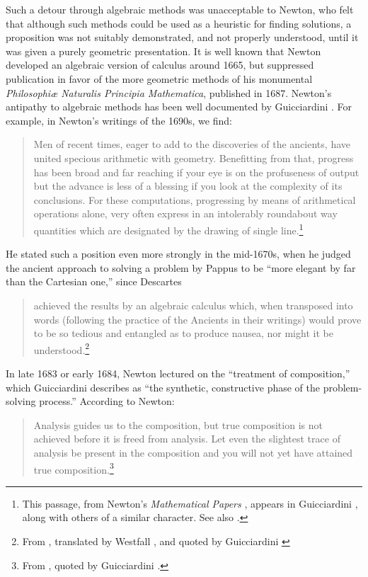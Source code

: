 \documentclass{amsart}
\theoremstyle{definition}
\theoremstyle{remark}
\numberwithin{equation}{section}
\begin{document}
Such a detour through algebraic methods was unacceptable to Newton, who felt that although such methods could be used as a heuristic for finding solutions, a proposition was not suitably demonstrated, and not properly understood, until it was given a purely geometric presentation. It is well known that Newton developed an algebraic version of calculus around 1665, but suppressed publication in favor of the more geometric methods of his monumental \emph{Philosophi{\ae} Naturalis Principia Mathematica}, published in 1687. Newton's antipathy to algebraic methods has been well documented by Guicciardini \cite{guicciardini:99,guicciardini:09}. For example, in Newton's writings of the 1690s, we find:
\begin{quote}
Men of recent times, eager to add to the discoveries of the ancients, have united specious arithmetic with geometry. Benefitting from that, progress has been broad and far reaching if your eye is on the profuseness of output but the advance is less of a blessing if you look at the complexity of its conclusions. For these computations, progressing by means of arithmetical operations alone, very often express in an intolerably roundabout way quantities which are designated by the drawing of single line.\footnote{This passage, from Newton's \emph{Mathematical Papers} \cite[vol.~7, p.~251]{newton:mp}, appears in Guicciardini \cite[Section 4.6]{guicciardini:09}, along with others of a similar character. See also \cite[Chapter 2]{guicciardini:09}.}
\end{quote}
He stated such a position even more strongly in the mid-1670s, when he judged the ancient approach to solving a problem by Pappus to be ``more elegant by far than the Cartesian one,'' since Descartes
\begin{quote}
achieved the results by an algebraic calculus which, when transposed into words (following the practice of the Ancients in their writings) would prove to be so tedious and entangled as to produce nausea, nor might it be understood.\footnote{From \cite[vol.~4, p.~277]{newton:mp}, translated by Westfall \cite[p.~379]{westfall:80}, and quoted by Guicciardini \cite[p.~29]{guicciardini:99}}
\end{quote}
In late 1683 or early 1684, Newton lectured on the ``treatment of composition,'' which Guicciardini describes as ``the synthetic, constructive phase of the problem-solving process.'' According to Newton:
\begin{quote}
Analysis guides us to the composition, but true composition is not achieved before it is freed from analysis. Let even the slightest trace of analysis be present in the composition and you will not yet have attained true composition.\footnote{From \cite[vol.~4, p.~477]{newton:mp}, quoted by Guicciardini \cite[pp.74--75]{guicciardini:09}.}
\end{quote}
\end{document}
